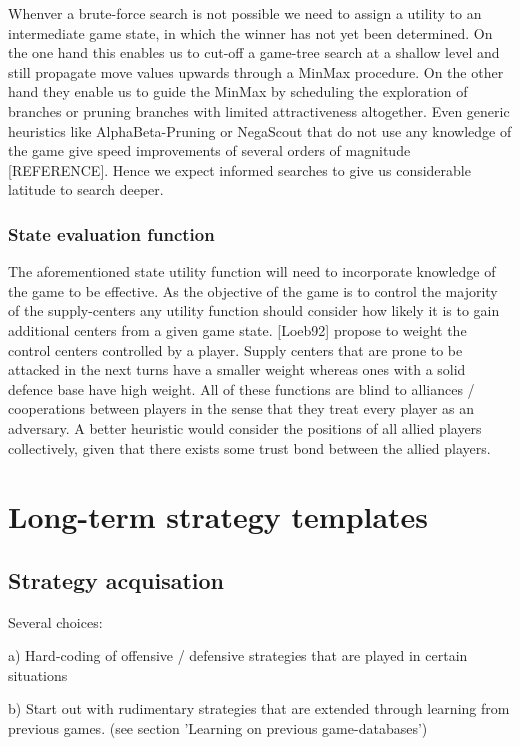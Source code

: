 \documentclass[12pt]{article}
\begin{document}
Whenver a brute-force search is not possible we need to assign a utility to an 
intermediate game state, in which the winner has not yet been determined. On the 
one hand this enables us to cut-off a game-tree search at a shallow level and
still propagate move values upwards through a MinMax procedure. On the other hand
they enable us to guide the MinMax by scheduling the exploration of branches or
pruning branches with limited attractiveness altogether. Even generic heuristics
like AlphaBeta-Pruning or NegaScout that do not use any knowledge of the game give
speed improvements of several orders of magnitude [REFERENCE]. Hence we expect
informed searches to give us considerable latitude to search deeper. 

\subsubsection{State evaluation function}

The aforementioned state utility function will need to incorporate knowledge
of the game to be effective. As the objective of the game is to control the 
majority of the supply-centers any utility function should consider how likely
it is to gain additional centers from a given game state. [Loeb92] propose to 
weight the control centers controlled by a player. Supply centers that are
prone to be attacked in the next turns have a smaller weight whereas ones with
a solid defence base have high weight. All of these functions are blind to 
alliances / cooperations between players in the sense that they treat every 
player as an adversary. A better heuristic would consider the positions of
all allied players collectively, given that there exists some trust bond
between the allied players. 


\section{Long-term strategy templates}

\subsection{Strategy acquisation}

Several choices: 

a) Hard-coding of offensive / defensive 
   strategies that are played in certain
   situations

b) Start out with rudimentary strategies that
   are extended through learning from previous games.
   (see section 'Learning on previous game-databases')
\end{document}
